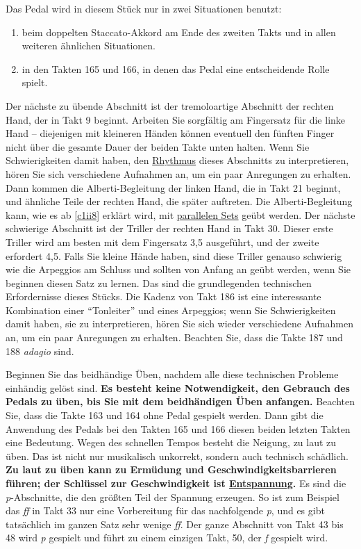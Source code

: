 Das Pedal wird in diesem Stück nur in zwei Situationen benutzt:

\begin{enumerate} 
 \item beim doppelten Staccato-Akkord am Ende des zweiten Takts und in allen weiteren ähnlichen Situationen.
 \item in den Takten 165 und 166, in denen das Pedal eine entscheidende Rolle spielt.
\end{enumerate}

Der nächste zu übende Abschnitt ist der tremoloartige Abschnitt der rechten Hand, der in Takt 9 beginnt.
Arbeiten Sie sorgfältig am Fingersatz für die linke Hand -- diejenigen mit kleineren Händen können eventuell den fünften Finger nicht über die gesamte Dauer der beiden Takte unten halten.
Wenn Sie Schwierigkeiten damit haben, den \hyperref[c1iii1b]{Rhythmus} dieses Abschnitts zu interpretieren, hören Sie sich verschiedene Aufnahmen an, um ein paar Anregungen zu erhalten.
Dann kommen die Alberti-Begleitung der linken Hand, die in Takt 21 beginnt, und ähnliche Teile der rechten Hand, die später auftreten.
Die Alberti-Begleitung kann, wie es ab \hyperref[c1ii8]{\autoref{c1ii8}} erklärt wird, mit \hyperref[c1iii7b]{parallelen Sets} geübt werden.
Der nächste schwierige Abschnitt ist der Triller der rechten Hand in Takt 30.
Dieser erste Triller wird am besten mit dem Fingersatz 3,5 ausgeführt, und der zweite erfordert 4,5.
Falls Sie kleine Hände haben, sind diese Triller genauso schwierig wie die Arpeggios am Schluss und sollten von Anfang an geübt werden, wenn Sie beginnen diesen Satz zu lernen.
Das sind die grundlegenden technischen Erfordernisse dieses Stücks.
Die Kadenz von Takt 186 ist eine interessante Kombination einer \enquote{Tonleiter} und eines Arpeggios; wenn Sie Schwierigkeiten damit haben, sie zu interpretieren, hören Sie sich wieder verschiedene Aufnahmen an, um ein paar Anregungen zu erhalten.
Beachten Sie, dass die Takte 187 und 188 \textit{adagio} sind.

Beginnen Sie das beidhändige Üben, nachdem alle diese technischen Probleme einhändig gelöst sind.
\textbf{Es besteht keine Notwendigkeit, den Gebrauch des Pedals zu üben, bis Sie mit dem beidhändigen Üben anfangen.}
Beachten Sie, dass die Takte 163 und 164 ohne Pedal gespielt werden.
Dann gibt die Anwendung des Pedals bei den Takten 165 und 166 diesen beiden letzten Takten eine Bedeutung.
Wegen des schnellen Tempos besteht die Neigung, zu laut zu üben.
Das ist nicht nur musikalisch unkorrekt, sondern auch technisch schädlich.
\textbf{Zu laut zu üben kann zu Ermüdung und Geschwindigkeitsbarrieren führen; der Schlüssel zur Geschwindigkeit ist \hyperref[c1ii14]{Entspannung}.}
Es sind die \textit{p}-Abschnitte, die den größten Teil der Spannung erzeugen.
So ist zum Beispiel das \textit{ff} in Takt 33 nur eine Vorbereitung für das nachfolgende \textit{p}, und es gibt tatsächlich im ganzen Satz sehr wenige \textit{ff}.
Der ganze Abschnitt von Takt 43 bis 48 wird \textit{p} gespielt und führt zu einem einzigen Takt, 50, der \textit{f} gespielt wird.


